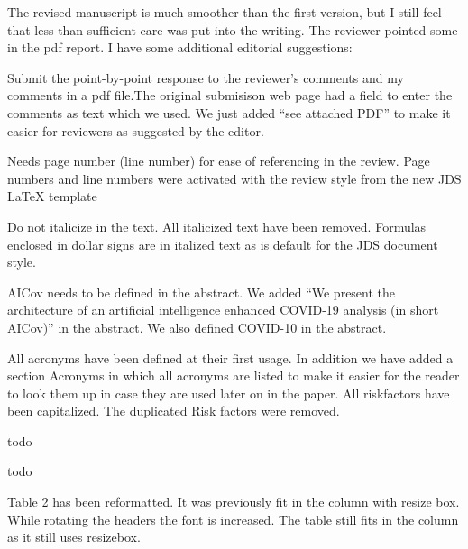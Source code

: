 The revised manuscript is much smoother than the first version, but I
still feel that less than sufficient care was put into the
writing. The reviewer pointed some in the pdf report. I have some
additional editorial suggestions:

\bigskip

   {Submit the point-by-point response to the
    reviewer's comments and my comments in a pdf file.}{The original
    submisison web page had a field to enter the comments as text
    which we used. We just added ``see attached PDF'' to make it
    easier for reviewers as suggested by the editor.}

   {Needs page number (line number) for ease of
    referencing in the review.}
  {Page numbers and line numbers were
    activated with the review style from the new JDS \LaTeX{}
    template}

   {Do not italicize in the text.}
  {All italicized text
    have been removed.  Formulas enclosed in dollar signs are in
    italized text as is default for the JDS document style.}


   {AICov needs to be defined in the abstract.}
  {We added ``We present the architecture of an artificial
    intelligence enhanced COVID-19 analysis (in short AICov)''
  in the abstract. We also defined COVID-10 in the abstract.}

  {All acronyms have been defined at their first usage. In addition
    we have added a section Acronyms in which all acronyms are listed
    to make it easier for the reader to look them up in case they are
    used later on in the paper. All riskfactors have been capitalized.
    The duplicated Risk factors were removed.
  }
  

  { todo}


  { todo}


  { Table 2 has been reformatted. It was previously fit in the column
    with resize box. While rotating the headers the font is
    increased. The table still fits in the column as it still uses
    resizebox.}

